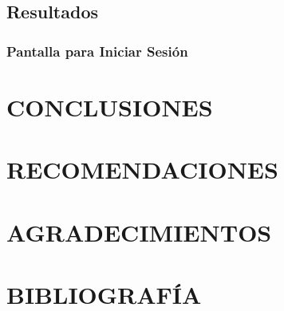 \documentclass[stu, 12pt, letterpaper, donotrepeattitle, floatsintext, natbib]{apa7}
\begin{document}
\subsection{Resultados}
\subsubsection{Pantalla para Iniciar Sesi\'on}
\section{\large CONCLUSIONES}
\section{\large RECOMENDACIONES}
\section{\large AGRADECIMIENTOS}
\section{\large BIBLIOGRAF\'IA}
\end{document}
